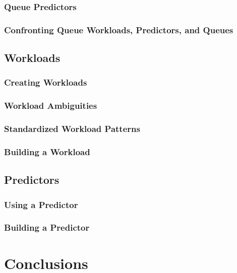 \documentclass[12pt]{book}
\begin{document}
\subsection{Queue Predictors}

\subsection{Confronting Queue Workloads, Predictors, and Queues}

\section{Workloads}

\subsection{Creating Workloads}

\subsection{Workload Ambiguities}

\subsection{Standardized Workload Patterns}

\subsection{Building a Workload}

\section{Predictors}

\subsection{Using a Predictor}

\subsection{Building a Predictor}

\chapter{Conclusions}
\end{document}
